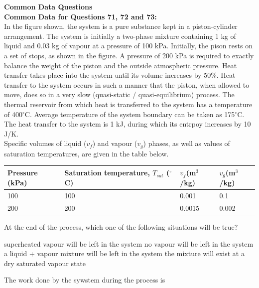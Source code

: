 \documentclass[addpoints,11pt]{exam}
\begin{document}
\begin{questions}
\pagebreak
\large\textbf{Common Data Questions}\\
\normalsize\textbf{Common Data for Questions 71, 72 and 73:}\\

In the figure shown, the system is a pure substance kept in a piston-cylinder arrangement. The system is initially a two-phase mixture containing 1 kg of liquid and 0.03 kg of vapour at a pressure of 100 kPa. Initially, the pison rests on a set of stops, as shown in the figure. A pressure of 200 kPa is required to exactly balance the weight of the piston and the outside atmospheric pressure. Heat transfer takes place into the system until its volume increases by 50\%. Heat transfer to the system occurs in such a manner that the piston, when allowed to move, does so in a very slow (quasi-static / quasi-equilibrium) process. The thermal reservoir from which heat is transferred to the system has a temperature of 400$^\circ$C. Average temperature of the system boundary can be taken as 175$^\circ$C. The heat transfer to the system is 1 kJ, during which its entrpoy increases by 10 J/K.%
\\Specific volumes of liquid ($v_f$) and vapour ($v_g$) phases, as well as values of saturation temperatures, are given in the table below.
\begin{center}
    \begin{tabular}{|l|l|l|l|}
        \hline
        Pressure (kPa)&Saturation temperature, $T_{sat}$ ($^\circ$C)&$v_f$(m$^3$/kg)&$v_g$(m$^3$/kg)\\\hline
        100 & 100 & 0.001 & 0.1\\\hline
        200 & 200 & 0.0015 & 0.002\\\hline
        
    \end{tabular}
\end{center}

    \question At the end of the process, which one of the following situations will be true?

    \begin{choices}
        \choice superheated vapour will be left in the system
        \choice no vapour will be left in the system
        \choice a liquid + vapour mixture will be left in the system
        \choice the mixture will exist at a dry saturated vapour state
    \end{choices}

    \question The work done by the sywstem during the process is


\end{questions}
\end{document}

